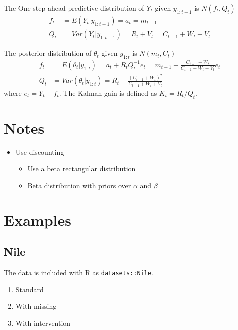\documentclass{article}\usepackage[]{graphicx}\usepackage[]{color}
\newcommand{\Rlang}{\textsf{R}}
\begin{document}
The One step ahead predictive distribution of $Y_{t}$ given $y_{1:t-1}$ is $N(f_{t}, Q_{t})$
\begin{align*}
  f_{t} &= E(Y_{t} | y_{1:t-1}) = a_{t} = m_{t-1} \\
  Q_{t} &= Var(Y_{t} | y_{1:t-1}) = R_{t} + V_{t} = C_{t-1} + W_{t} + V_{t}
\end{align*}

The posterior distribution of $\theta_{t}$ given $y_{1:t}$ is $N(m_{t}, C_{t})$
\begin{align*}
  f_{t} &= E(\theta_{t} | y_{1:t}) = a_{t} + R_{t} Q_{t}^{-1} e_{t} = m_{t-1} + \frac{C_{t-1} + W_{t}}{C_{t-1} + W_{t} + V_{t}} e_{t} \\
  Q_{t} &= Var(\theta_{t} | y_{1:t}) = R_{t} - \frac{(C_{t-1} + W_{t})^{2}}{C_{t-1} + W_{t} + V_{t}}
\end{align*}
where $e_{t} = Y_{t} - f_{t}$. The Kalman gain is defined as $K_{t} = R_{t} / Q_{t}$.



\section{Notes}

\begin{itemize}
\item Use discounting
  \begin{itemize}
  \item Use a beta rectangular distribution
  \item Beta distribution with priors over $\alpha$  and $\beta$
  \end{itemize}
\end{itemize}



\section{Examples}


\subsection{Nile}

The data is included with \Rlang{} as \texttt{datasets::Nile}.

\begin{enumerate}
\item Standard
\item With missing
\item With intervention
\end{enumerate}
\end{document}
